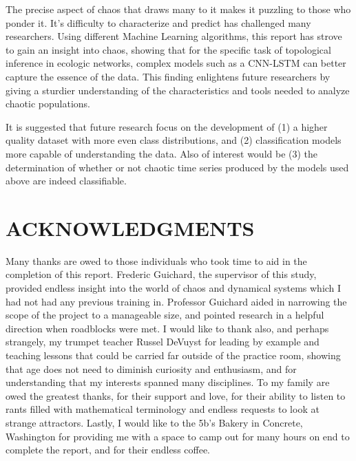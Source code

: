 \documentclass[letterpaper, 10 pt, conference]{ieeeconf}  %
\begin{document}
	The precise aspect of chaos that draws many to it makes it puzzling to those who ponder it. It's difficulty to characterize and predict has challenged many researchers. Using different Machine Learning algorithms, this report has strove to gain an insight into chaos, showing that for the specific task of topological inference in ecologic networks, complex models such as a CNN-LSTM can better capture the essence of the data. This finding enlightens future researchers by giving a sturdier understanding of the characteristics and tools needed to analyze chaotic populations. 
    
    It is suggested that future research focus on the development of (1) a higher quality dataset with more even class distributions, and (2) classification models more capable of understanding the data. Also of interest would be (3) the determination of whether or not chaotic time series produced by the models used above are indeed classifiable. 
    
\section{ACKNOWLEDGMENTS}
		Many thanks are owed to those individuals who took time to aid in the completion of this report. Frederic Guichard, the supervisor of this study, provided endless insight into the world of chaos and dynamical systems which I had not had any previous training in. Professor Guichard aided in narrowing the scope of the project to a manageable size, and pointed research in a helpful direction when roadblocks were met. I would like to thank also, and perhaps strangely, my trumpet teacher Russel DeVuyst for leading by example and teaching lessons that could be carried far outside of the practice room, showing that age does not need to diminish curiosity and enthusiasm, and for understanding that my interests spanned many disciplines. To my family are owed the greatest thanks, for their support and love, for their ability to listen to rants filled with mathematical terminology and endless requests to look at strange attractors. Lastly, I would like to the 5b's Bakery in Concrete, Washington for providing me with a space to camp out for many hours on end to complete the report, and for their endless coffee. 
\end{document}
